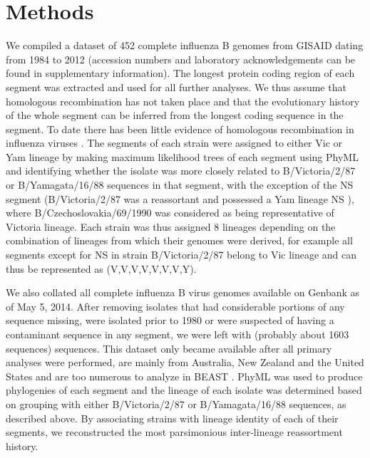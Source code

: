 \documentclass[11pt,oneside,letterpaper]{article}
\begin{document}
\section*{Methods}
We compiled a dataset of 452 complete influenza B genomes from GISAID \citep{GISAID} dating from 1984 to 2012 (accession numbers and laboratory acknowledgements can be found in supplementary information).
The longest protein coding region of each segment was extracted and used for all further analyses.
We thus assume that homologous recombination has not taken place and that the evolutionary history of the whole segment can be inferred from the longest coding sequence in the segment.
To date there has been little evidence of homologous recombination in influenza viruses \citep{chare2003,boni2008,han2010}.
The segments of each strain were assigned to either Vic or Yam lineage by making maximum likelihood trees of each segment using PhyML \citep{guindon2003} and identifying whether the isolate was more closely related to B/Victoria/2/87 or B/Yamagata/16/88 sequences in that segment, with the exception of the NS segment (B/Victoria/2/87 was a reassortant and possessed a Yam lineage NS \citep{lindstrom1999}), where B/Czechoslovakia/69/1990 was considered as being representative of Victoria lineage.
Each strain was thus assigned 8 lineages depending on the combination of lineages from which their genomes were derived, for example all segments except for NS in strain B/Victoria/2/87 belong to Vic lineage and can thus be represented as (V,V,V,V,V,V,V,Y).

We also collated all complete influenza B virus genomes available on Genbank as of May 5, 2014.
After removing isolates that had considerable portions of any sequence missing, were isolated prior to 1980 or were suspected of having a contaminant sequence in any segment, we were left with (probably about 1603 sequences) sequences.
This dataset only became available after all primary analyses were performed, are mainly from Australia, New Zealand and the United States and are too numerous to analyze in BEAST \citep{drummond2012}.
PhyML \citep{guindon2003} was used to produce phylogenies of each segment and the lineage of each isolate was determined based on grouping with either B/Victoria/2/87 or B/Yamagata/16/88 sequences, as described above.
By associating strains with lineage identity of each of their segments, we reconstructed the most parsimonious inter-lineage reassortment history.
\end{document}
